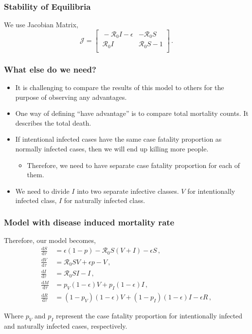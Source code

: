 \documentclass[12pt]{beamer}
\newcommand\dbyd[2]{\frac{\mathrm d{#1}}{\mathrm d{#2}}}
\newcommand{\R}{\mathcal{R}}
\newcommand{\pmV}{p_{V}}
\newcommand{\pmI}{p_{I}}
\begin{document}
\begin{frame}
\frametitle{Stability of Equilibria}

We use Jacobian Matrix,
\pause
\begin{equation}
\mathcal{J} =
\begin{bmatrix}
    \ -\R_0 I-\epsilon       & -\R_0 S \\
    \ \R_0 I       & \R_0 S-1 \\
\end{bmatrix} \,.
\end{equation}
\end{frame}
\begin{frame}
\frametitle{What else do we need?}
\pause
\begin{itemize}\itemsep10pt
\item It is challenging to compare the results of this model to others for the purpose of observing any advantages.
\pause
\item One way of defining ``have advantage'' is to compare total mortality counts. It describes the total death.
\pause
\item If intentional infected cases have the same case fatality proportion as normally infected cases, then we will end up killing more people.
\begin{itemize}
\item Therefore, we need to have separate case fatality proportion for each of them.
\end{itemize}
\pause
\item We need to divide $I$ into two separate infective classes. $V$ for intentionally infected class, $I$ for naturally infected class.
\end{itemize}
\end{frame}
\begin{frame}
\frametitle{Model with disease induced mortality rate}

Therefore, our model becomes,
\begin{subequations}\label{eq:base_ODE}
\begin{align}
\dbyd{S}{\tau}&=\epsilon(1-p)- \R_0 S(V+I)-\epsilon S\,, \label{eq:S_by_tau}\\
\dbyd{V}{\tau}&=\R_0 SV+\epsilon p-V\,, \label{eq:V_by_tau}\\
\dbyd{I}{\tau}&=\R_0 SI-I\,, \label{eq:I_by_tau}\\
\dbyd{M}{\tau}&=\pmV(1-\epsilon) V+\pmI(1-\epsilon) I\,,\\
\dbyd{R}{\tau}&=(1-\pmV)(1-\epsilon) V+(1-\pmI)(1-\epsilon) I-\epsilon R\,,
\end{align}
\end{subequations}

Where $\pmV$ and $\pmI$ represent the case fatality proportion for intentionally infected and naturally infected cases, respectively.
\end{frame}
\end{document}
